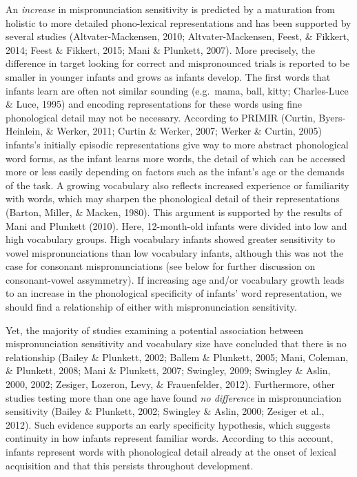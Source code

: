 \documentclass[man]{apa6}
\begin{document}
An \emph{increase} in mispronunciation sensitivity is predicted by a maturation from holistic to more detailed phono-lexical representations and has been supported by several studies (Altvater-Mackensen, 2010; Altvater-Mackensen, Feest, \& Fikkert, 2014; Feest \& Fikkert, 2015; Mani \& Plunkett, 2007). More precisely, the difference in target looking for correct and mispronounced trials is reported to be smaller in younger infants and grows as infants develop. The first words that infants learn are often not similar sounding (e.g.~mama, ball, kitty; Charles-Luce \& Luce, 1995) and encoding representations for these words using fine phonological detail may not be necessary. According to PRIMIR (Curtin, Byers-Heinlein, \& Werker, 2011; Curtin \& Werker, 2007; Werker \& Curtin, 2005) infants's initially episodic representations give way to more abstract phonological word forms, as the infant learns more words, the detail of which can be accessed more or less easily depending on factors such as the infant's age or the demands of the task. A growing vocabulary also reflects increased experience or familiarity with words, which may sharpen the phonological detail of their representations (Barton, Miller, \& Macken, 1980). This argument is supported by the results of Mani and Plunkett (2010). Here, 12-month-old infants were divided into low and high vocabulary groups. High vocabulary infants showed greater sensitivity to vowel mispronunciations than low vocabulary infants, although this was not the case for consonant mispronunciations (see below for further discussion on consonant-vowel assymmetry). If increasing age and/or vocabulary growth leads to an increase in the phonological specificity of infants' word representation, we should find a relationship of either with mispronunciation sensitivity.

Yet, the majority of studies examining a potential association between mispronunciation sensitivity and vocabulary size have concluded that there is no relationship (Bailey \& Plunkett, 2002; Ballem \& Plunkett, 2005; Mani, Coleman, \& Plunkett, 2008; Mani \& Plunkett, 2007; Swingley, 2009; Swingley \& Aslin, 2000, 2002; Zesiger, Lozeron, Levy, \& Frauenfelder, 2012). Furthermore, other studies testing more than one age have found \emph{no difference} in mispronunciation sensitivity (Bailey \& Plunkett, 2002; Swingley \& Aslin, 2000; Zesiger et al., 2012). Such evidence supports an early specificity hypothesis, which suggests continuity in how infants represent familiar words. According to this account, infants represent words with phonological detail already at the onset of lexical acquisition and that this persists throughout development.
\end{document}

